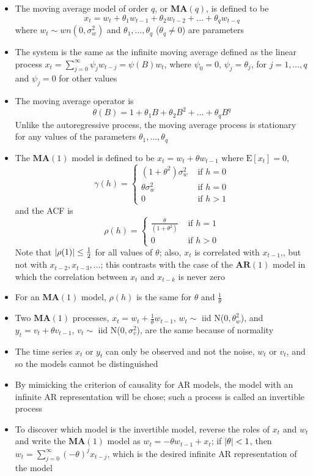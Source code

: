 \documentclass[12pt]{article}
\newcommand{\expe}[1]{\text{E}\left[ #1 \right]}
\newcommand{\ar}[1]{$\mathbf{AR}(#1)$}
\newcommand{\ma}[1]{$\mathbf{MA}(#1)$}
\begin{document}
\begin{itemize}
\item The moving average model of order $q$, or \ma{q}, is defined to be $$ x_t = w_t + \theta_1w_{t-1} + \theta_2w_{t-2} + \dots + \theta_qw_{t-q} $$ where $w_t \sim wn(0, \sigma^2_w)$ and $\theta_1,\dots,\theta_q$ ($\theta_q \neq 0$) are parameters 
\item The system is the same as the infinite moving average defined as the linear process $x_t = \sum_{j=0}^\infty \psi_jw_{t-j} = \psi(B)w_t$, where $\psi_0 = 0$, $\psi_j = \theta_j$, for $j=1,\dots,q$ and $\psi_j = 0$ for other values
\item The moving average operator is $$ \theta(B) = 1 + \theta_1B + \theta_2B^2 + \dots + \theta_qB^q $$ Unlike the autoregressive process, the moving average process is stationary for any values of the parameters $\theta_1,\dots, \theta_q$
\item The \ma{1} model is defined to be $x_t = w_t + \theta w_{t-1}$ where $\expe{x_t} = 0$, $$\gamma(h) = \begin{cases} (1+\theta^2)\sigma^2_w &\text{ if } h = 0 \\ \theta\sigma^2_w &\text{ if } h = 0 \\ 0 &\text{ if } h > 1 \end{cases} $$ and the ACF is $$ \rho(h) = \begin{cases} \frac{\theta}{(1 + \theta^2)} &\text{ if } h = 1 \\ 0 &\text{ if } h > 0 \end{cases} $$ Note that $\abs{\rho(1)} \leq \frac{1}{2}$ for all values of $\theta$; also, $x_t$ is correlated with $x_{t-1}$,, but not with $x_{t-2}, x_{t-3},\dots$; this contrasts with the case of the \ar{1} model in which the correlation between $x_t$ and $x_{t-k}$ is never zero
\item For an \ma{1} model, $\rho(h)$ is the same for $\theta$ and $\frac{1}{\theta}$
\item Two \ma{1} processes, $x_t = w_t + \frac{1}{\theta}w_{t-1}$, $w_t \sim $ iid N($0, \theta^2_w$), and $y_t = v_t + \theta v_{t-1}$, $v_t \sim $ iid N($0, \sigma^2_v$), are the same because of normality
\item The time series $x_t$ or $y_t$ can only be observed and not the noise, $w_t$ or $v_t$, and so the models cannot be distinguished
\item By mimicking the criterion of causality for AR models, the model with an infinite AR representation will be chose; such a process is called an invertible process
\item To discover which model is the invertible model, reverse the roles of $x_t$ and $w_t$ and write the \ma{1} model as $w_t = -\theta w_{t-1} + x_t$; if $\abs{\theta} < 1$, then $w_t = \sum_{j=0}^\infty (-\theta)^j x_{t-j}$, which is the desired infinite AR representation of the model

\end{itemize}
\end{document}
